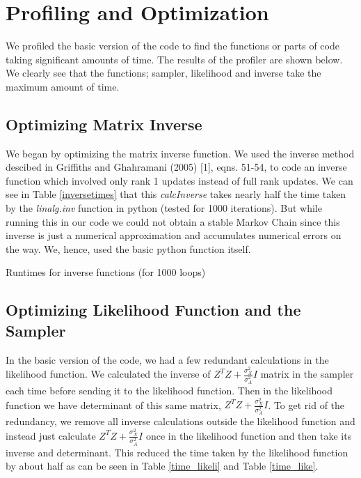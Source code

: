\documentclass[11pt]{article}
\begin{document}
\section{Profiling and Optimization}
We profiled the basic version of the code to find the functions or parts of code taking significant amounts of time. The results of the profiler are shown below. We clearly see that the functions; sampler, likelihood and inverse take the maximum amount of time.\\


\subsection{Optimizing Matrix Inverse}
We began by optimizing the matrix inverse function. We used the inverse method descibed in Griffiths and Ghahramani (2005) [1], eqns. 51-54, to code an inverse function which involved only rank 1 updates instead of full rank updates. We can see in Table \ref{inversetimes} that this \textit{calcInverse} takes nearly half the time taken by the \textit{linalg.inv} function in python (tested for 1000 iterations). But while running this in our code we could not obtain a stable Markov Chain since this inverse is just a numerical approximation and accumulates numerical errors on the way. We, hence, used the basic python function itself.\\

\begin{table}[ht]
\centering
\caption{Runtimes for inverse functions (for 1000 loops) \label{inversetimes}}

\end{table}

\subsection{Optimizing Likelihood Function and the Sampler}
In the basic version of the code, we had a few redundant calculations in the likelihood function. We calculated the inverse of $Z^TZ+\frac{\sigma_X^2}{\sigma_A^2}I$ matrix in the sampler each time before sending it to the likelihood function. Then in the likelihood function we have determinant of this same matrix, $Z^TZ+\frac{\sigma_X^2}{\sigma_A^2}I$. To get rid of the redundancy, we remove all inverse calculations outside the likelihood function and instead just calculate $Z^TZ+\frac{\sigma_X^2}{\sigma_A^2}I$ once in the likelihood function and then take its inverse and determinant. This reduced the time taken by the likelihood function by about half as can be seen in Table \ref{time_likeli} and Table \ref{time_like}.\\
\end{document}
